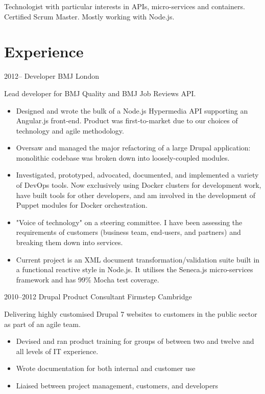 \documentclass[11pt,a4paper]{moderncv}
\date{06/11/2014}
\begin{document}
\maketitle

Technologist with particular interests in APIs, micro-services and containers. Certified Scrum Master. Mostly working with Node.js.

\section{Experience}


\cventry
  {2012--}
  {Developer}
  {BMJ}
  {London}
  {}
  {
    Lead developer for BMJ Quality and BMJ Job Reviews API.
    \begin{itemize}[label=\textbullet]
      \item Designed and wrote the bulk of a Node.js Hypermedia API supporting an Angular.js front-end. Product was first-to-market due to our choices of technology and agile methodology.
      \item Oversaw and managed the major refactoring of a large Drupal application: monolithic codebase was broken down into loosely-coupled modules.
      \item Investigated, prototyped, advocated, documented, and implemented a variety of DevOps tools. Now exclusively using Docker clusters for development work, have built tools for other developers, and am involved in the development of Puppet modules for Docker orchestration.
      \item "Voice of technology" on a steering committee. I have been assessing the requirements of customers (business team, end-users, and partners) and breaking them down into services.
      \item Current project is an XML document transformation/validation suite built in a functional reactive style in Node.js. It utilises the Seneca.js micro-services framework and has 99\% Mocha test coverage.
    \end{itemize}
  }

\cventry
  {2010--2012}
  {Drupal Product Consultant}
  {Firmstep}
  {Cambridge}
  {}
  {
    Delivering highly customised Drupal 7 websites to customers in the public sector as part of an agile team.
    \begin{itemize}[label=\textbullet]
      \item Devised and ran product training for groups of between two and twelve and all levels of IT experience.
      \item Wrote documentation for both internal and customer use
      \item Liaised between project management, customers, and developers
    \end{itemize}
  }
\end{document}
